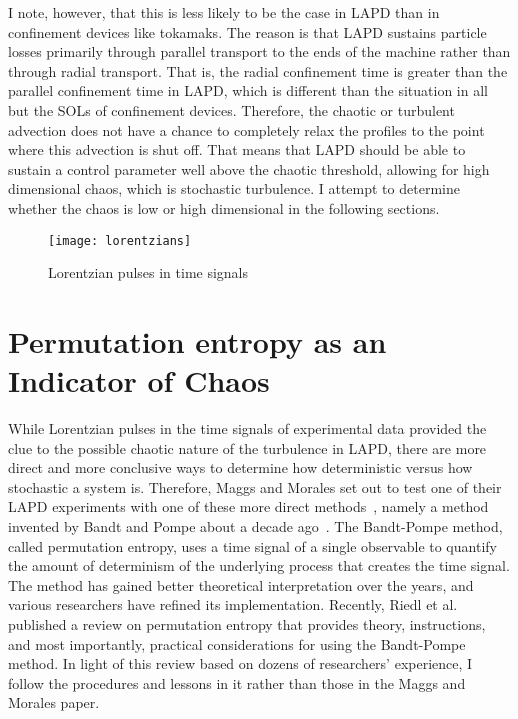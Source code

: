 I note, however, that this is less likely to be the case in LAPD than in confinement devices like tokamaks. The reason is that LAPD sustains particle losses primarily through parallel transport
to the ends of the machine rather than through radial transport. That is, the radial confinement time is greater than the parallel confinement time in LAPD, which is different than the situation
in all but the SOLs of confinement devices. Therefore, the chaotic or turbulent advection does not have a chance to completely relax the profiles to the point where this advection is shut off.
That means that LAPD should be able to sustain a control parameter well above the chaotic threshold, allowing for high dimensional chaos, which is stochastic turbulence. I attempt to determine whether
the chaos is low or high dimensional in the following sections.

\begin{figure}[!]
\centerline{\texttt{[image: lorentzians]}}
\caption{Lorentzian pulses in time signals}
\label{lorentzians}
\end{figure}


\section{Permutation entropy as an Indicator of Chaos}
\label{s_ent_comp}

While Lorentzian pulses in the time signals of experimental data provided the clue to the possible chaotic nature of the turbulence in LAPD, there are more direct and more conclusive ways
to determine how deterministic versus how stochastic a system is. Therefore, Maggs and Morales set out to test one of their LAPD experiments with one of these more direct methods~\cite{maggs2013},
namely a method invented by Bandt and Pompe about a decade ago~\cite{bandt2002}. The Bandt-Pompe method, called permutation entropy, uses a
time signal of a single observable to quantify the amount of determinism of the underlying process that creates the time signal. The method has gained better theoretical
interpretation over the years, and various researchers have refined its implementation. Recently, Riedl et al.~\cite{riedle2013} published a review on permutation entropy that provides theory,
instructions, and most importantly, practical considerations for using the Bandt-Pompe method. In light of this review based on dozens of researchers' experience, I follow the procedures and lessons
in it rather than those in the Maggs and Morales paper.

